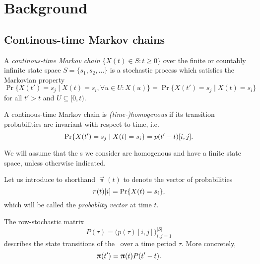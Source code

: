 \chapter{Background}

\section{Continous-time Markov chains}

\begin{dfn}
  A \emph{continous-time Markov chain} \paren{\emph{\ctmc}}
  $\{X(t) \in S : t \ge 0\}$ over the finite or countably infinite
  state space $S = \{s_1, s_2, \ldots\}$ is a stochastic process which
  satisfies the Markovian property
  \begin{equation}
    \Pr \{ X(t') = s_{j} \mid X(t) = s_{i}, \forall u \in U : X(u) \}
    = \Pr \{ X(t') = s_{j} \mid X(t) = s_{i} \}
  \end{equation}
  for all $t' > t$ and $U \subseteq [0, t)$.
\end{dfn}

\begin{dfn}
  A continous-time Markov chain is \emph{(time-)homogenous} if its
  transition probabilities are invariant with respect to time, i.e.
  \begin{equation}
    \Pr \{ X(t') = s_{j} \mid X(t) = s_{i} \} = p(t' - t)[i, j] \text.
  \end{equation}
\end{dfn}

We will assume that the \ctmc s we consider are homogenous and have a
finite state space, unless otherwise indicated.

Let us introduce to shorthand $\vec{\uppi}(t)$ to denote the vector of
probabilities
\begin{equation}
  \pi(t)[i] = \Pr\{X(t) = s_i\} \text,
\end{equation}
which will be called the \emph{probablity vector} at time $t$.

The row-stochastic matrix
\begin{equation}
  P(\tau) = \bigl(p(\tau)[i, j]\bigr)_{i, j = 1}^{\lvert S \rvert}
  \label{eq:intro:p_tau}
\end{equation}
describes the state transitions of the \ctmc\ over a time period
$\tau$. More concretely,
\begin{equation}
  \vec{\uppi}(t') = \vec{\uppi}(t) P(t' - t) \text.
\end{equation}

